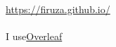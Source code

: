 \documentclass{article}
\begin{document}
	\url{https://firuza.github.io/}
	
	\paragraph{}
	I use\href{https://www.overleaf.com}{Overleaf}
\end{document}
